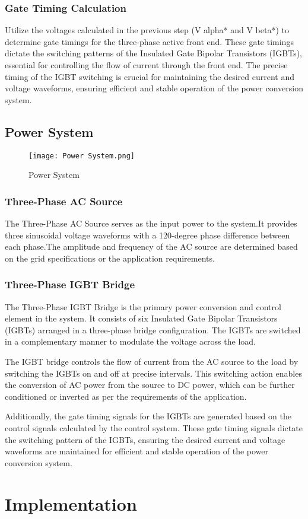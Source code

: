 \subsubsection{Gate Timing Calculation}
Utilize the voltages calculated in the previous step (V alpha* and V beta*) to
determine gate timings for the three-phase active front end. These gate timings
dictate the switching patterns of the Insulated Gate Bipolar Transistors
(IGBTs), essential for controlling the flow of current through the front end.
The precise timing of the IGBT switching is crucial for maintaining the desired
current and voltage waveforms, ensuring efficient and stable operation of the
power conversion system.

\subsection{Power System}
\begin{figure}[h]
    \centering
    \texttt{[image: Power System.png]}
    \caption{Power System}
    \label{fig:Power System}
\end{figure}

\subsubsection{Three-Phase AC Source}
The Three-Phase AC Source serves as the input power to the system.It provides
three sinusoidal voltage waveforms with a 120-degree phase difference between
each phase.The amplitude and frequency of the AC source are determined based on
the grid specifications or the application requirements.
\subsubsection{Three-Phase IGBT Bridge}
The Three-Phase IGBT Bridge is the primary power conversion and control element
in the system. It consists of six Insulated Gate Bipolar Transistors (IGBTs)
arranged in a three-phase bridge configuration. The IGBTs are switched in a
complementary manner to modulate the voltage across the load.

The IGBT bridge controls the flow of current from the AC source to the load by
switching the IGBTs on and off at precise intervals. This switching action
enables the conversion of AC power from the source to DC power, which can be
further conditioned or inverted as per the requirements of the application.

Additionally, the gate timing signals for the IGBTs are generated based on the
control signals calculated by the control system. These gate timing signals
dictate the switching pattern of the IGBTs, ensuring the desired current and
voltage waveforms are maintained for efficient and stable operation of the
power conversion system.

\section{Implementation}